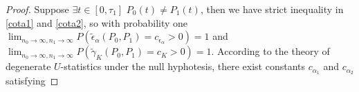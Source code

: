 \documentclass[11pt]{article}
\begin{document}
\begin{appendices}
\begin{proof}
	
	

	
	
	
	
	
	
	Suppose $\exists t \in [0,\tau_1]$ $P_0 (t) \neq P_1 (t)$, then we have strict	inequality in \ref{cota1} and \ref{cota2}, so  with probability one  $\lim_{n_0\to \infty,n_1 \to \infty} P(\tilde{\epsilon}_{\alpha}(P_0,P_1) = c_{\epsilon_\alpha}>0)=1$ and $\lim_{n_0\to \infty,n_1 \to \infty} P(\tilde{\gamma}_K(P_0,P_1)= c_K>0)=1$.  
	According to the theory of degenerate $U$-statistics \cite{korolyuk2013theory}  under the null hyphotesis, there exist constants $c_{\alpha_1}$ and  $c_{\alpha_2}$  satisfying 
	

\end{proof}
\end{appendices}
\end{document}
